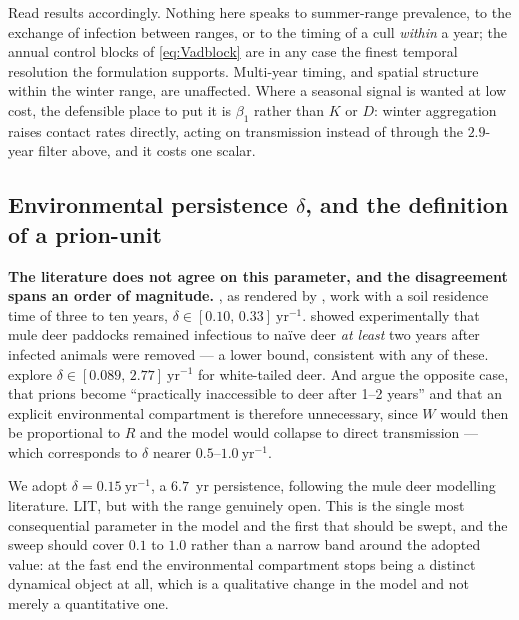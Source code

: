 \documentclass[11pt]{article}
\newcommand{\tagLIT}{{\footnotesize\textsf{\textcolor{green!40!black}{LIT}}}}
\begin{document}
Read results accordingly. Nothing here speaks to summer-range prevalence, to the exchange of infection between ranges, or to the timing of a cull \emph{within} a year; the annual control blocks of \eqref{eq:Vadblock} are in any case the finest temporal resolution the formulation supports. Multi-year timing, and spatial structure within the winter range, are unaffected. Where a seasonal signal is wanted at low cost, the defensible place to put it is $\beta_1$ rather than $K$ or $D$: winter aggregation raises contact rates directly, acting on transmission instead of through the $2.9$-year filter above, and it costs one scalar.

\subsection{Environmental persistence $\delta$, and the definition of a prion-unit}
\label{sec:params-delta}

\textbf{The literature does not agree on this parameter, and the disagreement spans an order of magnitude.} \citet{Miller2006}, as rendered by \citet{SharpPastor2011}, work with a soil residence time of three to ten years, $\delta \in [0.10,\,0.33]\ \mathrm{yr}^{-1}$. \citet{Miller2004} showed experimentally that mule deer paddocks remained infectious to na\"ive deer \emph{at least} two years after infected animals were removed --- a lower bound, consistent with any of these. \citet{Almberg2011} explore $\delta\in[0.089,\,2.77]\ \mathrm{yr}^{-1}$ for white-tailed deer. And \citet{Potapov2016} argue the opposite case, that prions become ``practically inaccessible to deer after 1--2 years'' and that an explicit environmental compartment is therefore unnecessary, since $W$ would then be proportional to $R$ and the model would collapse to direct transmission --- which corresponds to $\delta$ nearer $0.5$--$1.0\ \mathrm{yr}^{-1}$.

We adopt $\delta = 0.15\ \mathrm{yr}^{-1}$, a $6.7$~yr persistence, following the mule deer modelling literature. \tagLIT{}, but with the range genuinely open. This is the single most consequential parameter in the model and the first that should be swept, and the sweep should cover $0.1$ to $1.0$ rather than a narrow band around the adopted value: at the fast end the environmental compartment stops being a distinct dynamical object at all, which is a qualitative change in the model and not merely a quantitative one.
\end{document}
